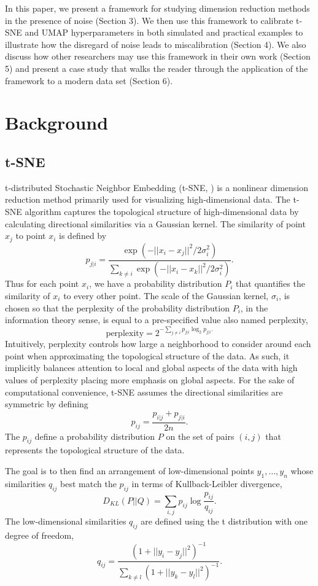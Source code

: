 \documentclass{article}
\begin{document}
In this paper, we present a framework for studying dimension reduction methods in the presence of noise (Section 3). We then use this framework to calibrate t-SNE and UMAP hyperparameters in both simulated and practical examples to illustrate how the disregard of noise leads to miscalibration (Section 4). We also discuss how other researchers may use this framework in their own work (Section 5) and present a case study that walks the reader through the application of the framework to a modern data set (Section 6).

\section{Background}

\subsection{t-SNE}
t-distributed Stochastic Neighbor Embedding (t-SNE, \cite{t-SNE}) is a nonlinear dimension reduction method primarily used for visualizing high-dimensional data. The t-SNE algorithm captures the topological structure of high-dimensional data by calculating directional similarities via a Gaussian kernel. The similarity of point $x_j$ to point $x_i$ is defined by $$p_{j|i} = \frac{\exp(-||x_i - x_j||^2/2\sigma_i^2)}{\sum_{k \neq i} \exp(-||x_i-x_k||^2/2\sigma_i^2)}.$$ Thus for each point $x_i$, we have a probability distribution $P_i$ that quantifies the similarity of $x_i$ to every other point. The scale of the Gaussian kernel, $\sigma_i$, is chosen so that the perplexity of the probability distribution $P_i$, in the information theory sense, is equal to a pre-specified value also named perplexity, $$\textrm{perplexity} = 2^{-\sum_{j \neq i} p_{j|i}\log_2 p_{j|i}.}$$ Intuitively, perplexity controls how large a neighborhood to consider around each point when approximating the topological structure of the data. As such, it implicitly balances attention to local and global aspects of the data with high values of perplexity placing more emphasis on global aspects. For the sake of computational convenience, t-SNE assumes the directional similarities are symmetric by defining $$p_{ij} = \frac{p_{i|j} + p_{j|i}}{2n}.$$ The $p_{ij}$ define a probability distribution $P$ on the set of pairs $(i,j)$ that represents the topological structure of the data.

The goal is to then find an arrangement of low-dimensional points $y_1, \hdots, y_n$ whose similarities $q_{ij}$ best match the $p_{ij}$ in terms of Kullback-Leibler divergence, $$D_{KL}(P || Q) = \sum_{i,j} p_{ij} \log \frac{p_{ij}}{q_{ij}}.$$ The low-dimensional similarities $q_{ij}$ are defined using the t distribution with one degree of freedom, $$q_{ij} = \frac{(1 + ||y_i - y_j||^2)^{-1}}{ \sum_{k \neq l} (1 + ||y_k - y_l||^2)^{-1}}.$$
\end{document}
